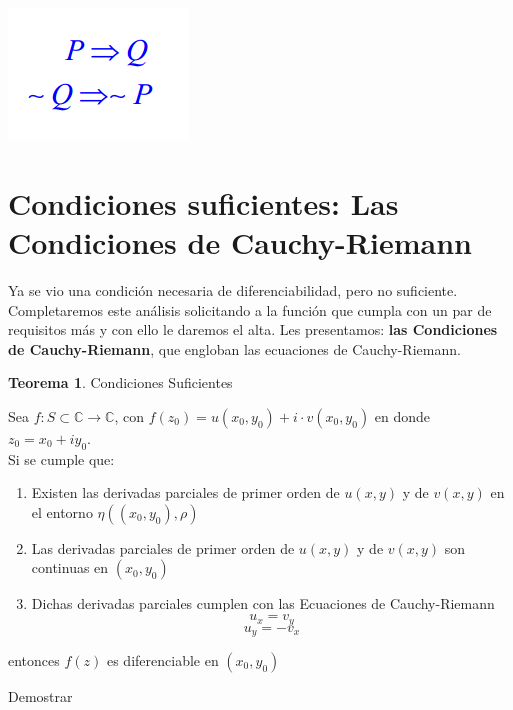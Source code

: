 \documentclass[12pt]{article}
\theoremstyle{definition}
\theoremstyle{theorem}
\newtheorem{theorem}{Teorema}[section]
\theoremstyle{corolary}
\begin{document}
\begin{center}
	\includegraphics[scale=1]{logica.png}
\end{center}


\section{Condiciones suficientes: Las Condiciones de Cauchy-Riemann}

Ya se vio una condici\'on necesaria de diferenciabilidad, pero no suficiente. Completaremos este an\'alisis solicitando a la funci\'on que cumpla con un par de requisitos m\'as y con ello le daremos el alta. Les presentamos: \textbf{las Condiciones de Cauchy-Riemann}, que engloban las ecuaciones de Cauchy-Riemann.\\

\colorbox{green!40!white!80}{\parbox{\linewidth}{
\theoremstyle{theorem}
\begin{theorem} {Condiciones Suficientes}

Sea $f: S \subset \mathbb{C} \rightarrow \mathbb{C}$, con $f(z_0) = u(x_0, y_0) + i\cdot v(x_0, y_0)$ en donde $z_0 = x_0+iy_0$.\\

Si se cumple que:
\begin{enumerate}
	\item Existen las derivadas parciales de primer orden de $u(x, y)$ y de $v(x, y)$ en el entorno $\eta ((x_0, y_0), \rho)$
	\item Las derivadas parciales de primer orden de $u(x, y)$ y de $v(x, y)$ son continuas en $(x_0, y_0)$
	\item Dichas derivadas parciales cumplen con las Ecuaciones de Cauchy-Riemann $$u_x = v_y$$ $$u_y = -v_x$$
\end{enumerate}

entonces $f(z)$ es diferenciable en $(x_0, y_0)$

\end{theorem}}}
\linebreak

Demostrar\\
\end{document}
